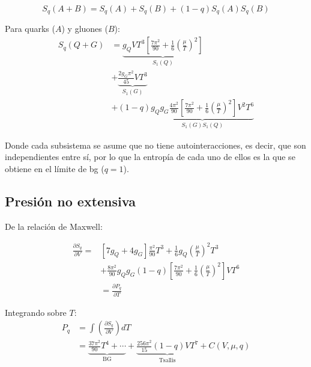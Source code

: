 \begin{equation}
{S}_{q}(A+B) = {S}_q(A) + {S}_q(B) + (1-q){S}_q(A){S}_q(B)
\end{equation}

Para quarks ($A$) y gluones ($B$):
\begin{align}
{S}_q(Q+G) &= \underbrace{{g}_Q V T^3 \left[\frac{7\pi^2}{90} + \frac{1}{6}\left(\frac{\mu}{T}\right)^2\right]}_{{S}_{1}(Q)} \nonumber \\
&+ \underbrace{\frac{2g_G\pi^2}{45}V T^3}_{{S}_{1}(G)} \nonumber \\
&+ \left(1-q \right)\underbrace{{g}_{Q}{g}_{G} \frac{4{\pi}^{2}}{90} \left[\frac{7{\pi}^{2}}{90} + \frac{1}{6} \left(\frac{\mu}{T} \right)^{2}\right]{V}^{2}{T}^{6}}_{{S}_{1}(G){S}_{1}(Q)} 
\end{align}

Donde cada subsistema se asume que no tiene autointeracciones, es decir, que son independientes entre sí, por lo que la entropía de cada uno de ellos es la que se obtiene en el límite de \gls{bg} ($q=1$). 

\subsection{Presión no extensiva}\label{app:Tsallis-pressure}
De la relación de Maxwell:


\begin{equation}
\begin{split}
\frac{\partial{S}_{q}}{\partial V}   =  & \left[ 7{g}_{Q} + 4 {g}_{G}\right] \frac{{\pi}^{2}}{90} {T}^{3} + \frac{1}{6} {g}_{Q} \left(\frac{\mu}{T} \right)^{2} {T}^{3}\\
& + \frac{8{\pi}^{2}}{90} {g}_{Q}{g}_{G} (1-q) \left[ \frac{7{\pi}^{2}}{90} + \frac{1}{6} \left(\frac{\mu}{T} \right)^{2} \right]V{T}^{6}\\
& = \frac{\partial{P}_{q}}{\partial T}
\end{split}
\end{equation}

Integrando sobre $T$:
\begin{align}
{P}_q &= \int \left(\frac{\partial{S}_q}{\partial V}\right) dT \nonumber \\
&= \underbrace{\frac{37\pi^2}{90}T^4 + \cdots}_{\text{BG}} + \underbrace{\frac{256\pi^2}{15}(1-q)V T^7}_{\text{Tsallis}} + C(V,\mu,q)
\end{align}

